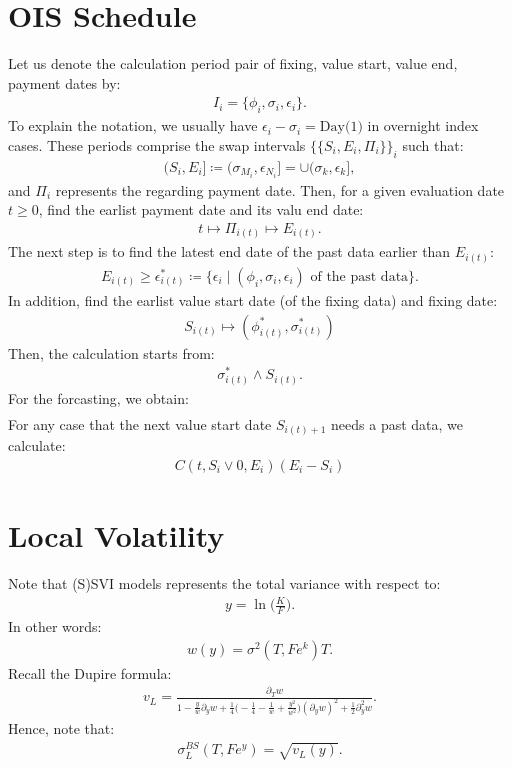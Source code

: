 \documentclass[a4paper, 11pt]{article}              %
\numberwithin{equation}{section}
\theoremstyle{plain}
\newcommand{\1}{\mathds{1}}
\theoremstyle{plain}
\theoremstyle{definition}
\theoremstyle{plain}
\begin{document}
\section{OIS Schedule}
\label{sec:ois}
Let us denote the calculation period pair of fixing, value start,
value end, payment dates by:
\begin{align}
  I_i = \{\phi_i, \sigma_i, \epsilon_i\}.
\end{align}
To explain the notation, we usually have $\epsilon_i - \sigma_i = \text{Day(1)}$
in overnight index cases. These periods comprise the swap intervals
$\{\{S_i, E_i, \Pi_i\}\}_i$ such that:
\begin{align}
  (S_i, E_i] \coloneqq (\sigma_{M_i}, \epsilon_{N_i}] = \cup(\sigma_k, \epsilon_k],
\end{align}
and $\Pi_i$ represents the regarding payment date. 
Then, for a given evaluation date $t \geq 0$, find the earlist payment date and
its valu end date:
\begin{align}
  t \mapsto \Pi_{i(t)} \mapsto E_{i(t)}.
\end{align}
The next step is to find the latest end date of the past data earlier than
$E_{i(t)}$:
\begin{align}
  E_{i(t)} \geq \epsilon^*_{i(t)}
  \coloneqq \{\epsilon_i \mid (\phi_i, \sigma_i, \epsilon_i) \text{ of the past data}\}.
\end{align}
In addition, find the earlist value start date (of the fixing data) and fixing
date:
\begin{align}
  S_{i(t)} \mapsto (\phi^*_{i(t)}, \sigma_{i(t)}^*) 
\end{align}
Then, the calculation starts from:
\begin{align}
  \sigma_{i(t)}^* \wedge S_{i(t)}.
\end{align}
For the forcasting, we obtain:
\begin{align}
  [1+C(0, 0, E_{i(t)}) (E_{i(t)} -\epsilon^*_{i(t)})]
\end{align}
For any case that the next value start date $S_{i(t)+1}$ needs a past data, we
calculate:
\begin{align}
  C(t, S_i \vee 0, E_i) (E_{i} -S_{i})
\end{align}

\section{Local Volatility}
Note that (S)SVI models represents the total variance with respect to:
\begin{align}
y = \ln\bigg(\frac{K}{F}\bigg).
\end{align}
In other words:
\begin{align}
  w(y) = \sigma^2(T, Fe^k)T. 
\end{align}
Recall the Dupire formula:
\begin{align}
  v_L = \frac{\partial_T w}{1-\frac{y}{w}\partial_y w
  +\frac{1}{4}\Big(-\frac{1}{4} - \frac{1}{w} +
  \frac{y^2}{w^2}\Big)(\partial_y w)^2 + \frac{1}{2}\partial^2_y w}.
\end{align}
Hence, note that:
\begin{align}
 \sigma^{BS}_L(T, Fe^y) = \sqrt{v_L(y)}.
\end{align}
\end{document}
